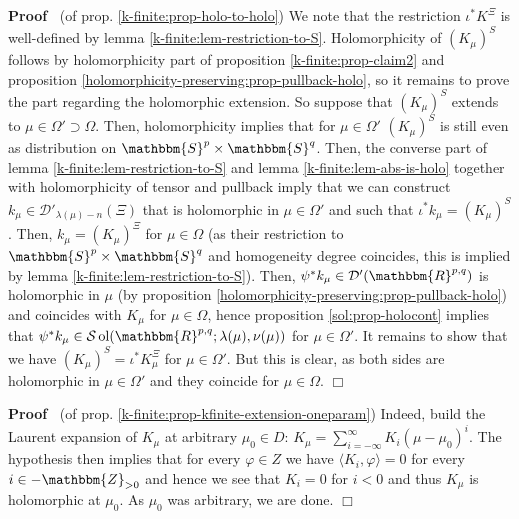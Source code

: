 \documentclass{article}
\newcommand{\tmop}[1]{\ensuremath{\operatorname{#1}}}
\newenvironment{proof}{\noindent\textbf{Proof\ }}{\hspace*{\fill}$\Box$\medskip}
\begin{document}
\begin{proof}
  (of prop. \ref{k-finite:prop-holo-to-holo}) We note that the restriction
  $\iota^{\ast} K^{\Xi}$ is well-defined by lemma
  \ref{k-finite:lem-restriction-to-S}. Holomorphicity of $(K_{\mu})^S$ follows
  by holomorphicity part of proposition \ref{k-finite:prop-claim2} and
  proposition \ref{holomorphicity-preserving:prop-pullback-holo}, so it
  remains to prove the part regarding the holomorphic extension. So suppose
  that $(K_{\mu})^S$ extends to $\mu \in \Omega' \supset \Omega$. Then,
  holomorphicity implies that for $\mu \in \Omega'$ $(K_{\mu})^S$ is still
  even as distribution on $\mathbbm{S}^p \times \mathbbm{S}^q$. Then, the
  converse part of lemma \ref{k-finite:lem-restriction-to-S} and lemma
  \ref{k-finite:lem-abs-is-holo} together with holomorphicity of tensor and
  pullback imply that we can construct $k_{\mu} \in \mathcal{D}'_{\lambda
  (\mu) - n} (\Xi)$ that is holomorphic in $\mu \in \Omega'$ and such that
  $\iota^{\ast} k_{\mu} = (K_{\mu})^S$. Then, $k_{\mu} = (K_{\mu})^{\Xi}$ for
  $\mu \in \Omega$ (as their restriction to $\mathbbm{S}^p \times
  \mathbbm{S}^q$ and homogeneity degree coincides, this is implied by lemma
  \ref{k-finite:lem-restriction-to-S}). Then, $\psi^{\ast} k_{\mu} \in
  \mathcal{D}' (\mathbbm{R}^{p, q})$ is holomorphic in $\mu$ (by proposition
  \ref{holomorphicity-preserving:prop-pullback-holo}) and coincides with
  $K_{\mu}$ for $\mu \in \Omega$, hence proposition \ref{sol:prop-holocont}
  implies that $\psi^{\ast} k_{\mu} \in \mathcal{S} \tmop{ol} (\mathbbm{R}^{p,
  q} ; \lambda (\mu), \nu (\mu))$ for $\mu \in \Omega'$. It remains to show
  that we have $(K_{\mu})^S = \iota^{\ast} K_{\mu}^{\Xi}$ for $\mu \in
  \Omega'$. But this is clear, as both sides are holomorphic in $\mu \in
  \Omega'$ and they coincide for $\mu \in \Omega$.
\end{proof}

\begin{proof}
  (of prop. \ref{k-finite:prop-kfinite-extension-oneparam}) Indeed, build the
  Laurent expansion of $K_{\mu}$ at arbitrary $\mu_0 \in D$: $K_{\mu} =
  \sum_{i = - \infty}^{\infty} K_i (\mu - \mu_0)^i$. The hypothesis then
  implies that for every $\varphi \in Z$ we have $\langle K_i, \varphi \rangle
  = 0$ for every $i \in -\mathbbm{Z}_{> 0}$ and hence we see that $K_i = 0$
  for $i < 0$ and thus $K_{\mu}$ is holomorphic at $\mu_0$. As $\mu_0$ was
  arbitrary, we are done.
\end{proof}
\end{document}
